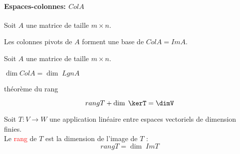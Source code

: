 \paragraph{Espaces-colonnes: $ColA$}
Soit $A$ une matrice de taille $m \times n$.
\begin{theoreme}
    Les colonnes pivots de $A$ forment une base de $ColA = Im A$.
\end{theoreme}
Soit $A$ une matrice de taille $m \times n$.
\begin{theoreme}

    $\dim ColA = \dim\; LgnA$

\end{theoreme}
\begin{theoreme}{théorème du rang}
    
        \[rangT + \dim\; \kerT  = \dimV\]
    
\end{theoreme}
\begin{definition}
Soit $T : V \to W$ une application linéaire entre espaces vectoriels de dimension finies.
\\
Le \textcolor{red}{rang} de $T$ est la dimension de l'image de $T$ : 
\[rang T = \dim \; ImT\]
\end{definition}

